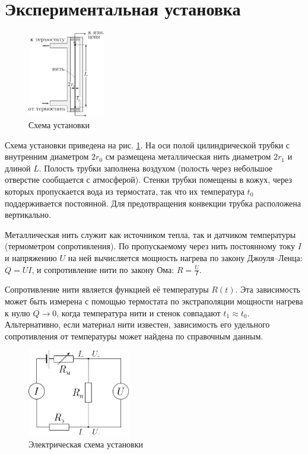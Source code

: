 \documentclass[a4paper,12pt]{article}
\begin{document}
\section{Экспериментальная установка}

  \begin{figure}
    \begin{center}
      \includegraphics[width = 0.3\textwidth]{apparatus.png}
    \end{center}
    \vspace*{-5mm}
    \caption{Схема установки}
    \label{fig:apparatus}
  \end{figure}
  Схема установки приведена на рис. \ref{fig:apparatus}. На оси полой цилиндрической трубки с внутренним диаметром $2r_0$ см размещена металлическая нить диаметром $2r_1$ и длиной $L$. Полость трубки заполнена воздухом (полость через небольшое отверстие сообщается с атмосферой). Стенки трубки помещены в кожух, через которых пропускается вода из термостата, так что их температура $t_0$ поддерживается постоянной. Для предотвращения конвекции трубка расположена вертикально.

  Металлическая нить служит как источником тепла, так и датчиком температуры (термометром сопротивления). По пропускаемому через нить постоянному току $I$ и напряжению $U$ на ней вычисляется мощность нагрева по закону Джоуля–Ленца: $Q = UI$, и сопротивление нити по закону Ома: $R = \frac{U}{I}$.

  Сопротивление нити является функцией её температуры $R(t)$.
  Эта зависимость может быть измерена с помощью термостата по экстраполяции мощности нагрева к нулю $Q \rightarrow 0$, когда температура нити и стенок совпадают $t_1 \approx t_0$. Альтернативно, если материал нити известен, зависимость его удельного сопротивления от температуры может найдена по справочным данным.

  \begin{figure}
    \begin{center}
      \includegraphics[width = 0.4\textwidth]{curcuit.png}
    \end{center}
    \vspace*{-5mm}
    \caption{Электрическая схема установки}
    \label{fig:curcuit}
  \end{figure}
\end{document}
